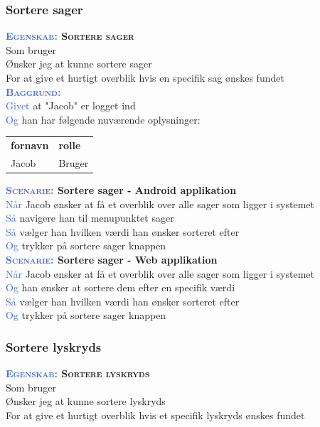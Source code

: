 \subsubsection{Sortere sager}
\textbf{\textsc{\textcolor{RoyalBlue}{Egenskab:} Sortere sager}}\\
Som bruger\\
Ønsker jeg at kunne sortere sager\\
For at give et hurtigt overblik hvis en specifik sag ønskes fundet\\

\textsc{\textcolor{RoyalBlue}{\textbf{Baggrund:}}}\\
\textcolor{RoyalBlue}{Givet} at "Jacob" er logget ind\\
\textcolor{RoyalBlue}{Og} han har følgende nuværende oplysninger:\\
\begin{tabular}{| l | l |}
	\textbf{fornavn} & \textbf{rolle} \\
	Jacob & Bruger\\
\end{tabular}
\newline \newline

\textbf{\textsc{\textcolor{RoyalBlue}{Scenarie:}} Sortere sager - Android applikation}\\
\textcolor{RoyalBlue}{Når} Jacob ønsker at få et overblik over alle sager som ligger i systemet\\
\textcolor{RoyalBlue}{Så} navigere han til menupunktet sager\\
\textcolor{RoyalBlue}{Så} vælger han hvilken værdi han ønsker sorteret efter\\
\textcolor{RoyalBlue}{Og} trykker på sortere sager knappen\\

\textbf{\textsc{\textcolor{RoyalBlue}{Scenarie:}} Sortere sager - Web applikation}\\
\textcolor{RoyalBlue}{Når} Jacob ønsker at få et overblik over alle sager som ligger i systemet\\
\textcolor{RoyalBlue}{Og} han ønsker at sortere dem efter en specifik værdi\\
\textcolor{RoyalBlue}{Så} vælger han hvilken værdi han ønsker sorteret efter\\
\textcolor{RoyalBlue}{Og} trykker på sortere sager knappen\\

\clearpage

\subsubsection{Sortere lyskryds}
\textbf{\textsc{\textcolor{RoyalBlue}{Egenskab:} Sortere lyskryds}}\\
Som bruger\\
Ønsker jeg at kunne sortere lyskryds\\
For at give et hurtigt overblik hvis et specifik lyskryds ønskes fundet\\

